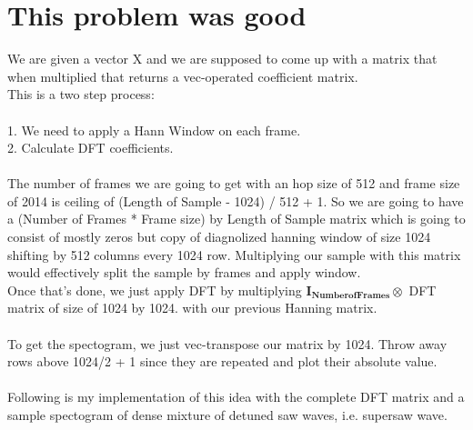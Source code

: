 \documentclass{article}
\newcommand{\matr}[1]{\mathbf{#1}}
\begin{document}
\section{This problem was good}
	We are given a vector X and we are supposed to come up with a matrix that when multiplied that returns a vec-operated coefficient matrix.\\
	This is a two step process:\\
	\\
	1. We need to apply a Hann Window on each frame.\\
	2. Calculate DFT coefficients.\\
	\\
	The number of frames we are going to get with an hop size of 512 and frame size of 2014 is ceiling of (Length of Sample - 1024) / 512 + 1.
	So we are going to have a (Number of Frames * Frame size) by Length of Sample matrix which is going to consist of mostly zeros but copy of 				diagnolized hanning window of size 1024 shifting by 512 columns every 1024 row. Multiplying our sample with this matrix would effectively split the 			sample by frames and apply window.
	\\
	Once that's done, we just apply DFT by multiplying $\matr{I_{Number of Frames}} \otimes$  DFT matrix of size of 1024 by 1024. with our previous 			Hanning matrix.\\
	\\
	To get the spectogram, we just vec-transpose our matrix by 1024. Throw away rows above 1024/2 + 1 since they are repeated and plot their absolute 		value.\\
	\\
	Following is my implementation of this idea with the complete DFT matrix and a sample spectogram of dense mixture of detuned saw waves, i.e. 			supersaw wave.


	
\end{document}
